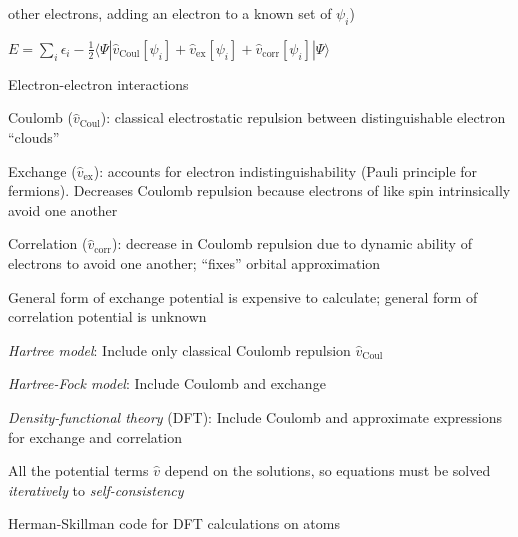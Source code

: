 \documentclass[11pt]{article}
\begin{document}
\begin{outline}
\begin{outline}
\begin{outline}
\begin{outline}
         other electrons, adding an electron to a known set of $\psi_i$)
       \item $E=\sum_i \epsilon_i-\frac{1}{2}\langle \Psi |\hat v_\mathrm{Coul}[\psi_i] + \hat
           v_\mathrm{ex}[\psi_i]+\hat v_\mathrm{corr}[\psi_i]|\Psi \rangle$
       \end{outline}
     \item Electron-electron interactions
       \begin{outline}
       \item Coulomb ($\hat v_\mathrm{Coul}$): classical electrostatic
         repulsion between distinguishable electron ``clouds''
       \item Exchange ($\hat v_\mathrm{ex}$): accounts for electron
         indistinguishability (Pauli principle for fermions).  Decreases
         Coulomb repulsion because electrons of like spin intrinsically avoid
         one another
       \item Correlation ($\hat v_\mathrm{corr}$): decrease in Coulomb
         repulsion due to dynamic ability of electrons to avoid one another;
         ``fixes'' orbital approximation
       \end{outline}
     \item General form of exchange potential is expensive to calculate; general
       form of correlation potential is unknown
       \begin{outline}
     \item {\em Hartree model}: Include only classical Coulomb repulsion $\hat
       v_\mathrm{Coul}$
     \item {\em Hartree-Fock model}: Include Coulomb and exchange
     \item {\em Density-functional theory} (DFT): Include Coulomb and
       approximate expressions for exchange and correlation         
       \end{outline}
     \item All the potential terms $\hat v$ depend on the solutions, so equations
       must be solved {\em iteratively} to {\em self-consistency}
     \end{outline}
   \item Herman-Skillman code for DFT calculations on atoms
   \end{outline}


\end{outline}
\end{document}

